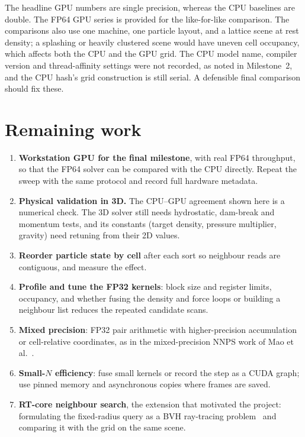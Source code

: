 \documentclass[11pt]{article}
\begin{document}
The headline GPU numbers are single precision, whereas the CPU baselines are double. The FP64 GPU series is provided for the like-for-like comparison. The comparisons also use one machine, one particle layout, and a lattice scene at rest density; a splashing or heavily clustered scene would have uneven cell occupancy, which affects both the CPU and the GPU grid. The CPU model name, compiler version and thread-affinity settings were not recorded, as noted in Milestone~2, and the CPU hash's grid construction is still serial. A defensible final comparison should fix these.

\section{Remaining work}\label{sec:future}

\begin{enumerate}
\item \textbf{Workstation GPU for the final milestone}, with real FP64 throughput, so that the FP64 solver can be compared with the CPU directly. Repeat the sweep with the same protocol and record full hardware metadata.
\item \textbf{Physical validation in 3D.} The CPU--GPU agreement shown here is a numerical check. The 3D solver still needs hydrostatic, dam-break and momentum tests, and its constants (target density, pressure multiplier, gravity) need retuning from their 2D values.
\item \textbf{Reorder particle state by cell} after each sort so neighbour reads are contiguous, and measure the effect.
\item \textbf{Profile and tune the FP32 kernels}: block size and register limits, occupancy, and whether fusing the density and force loops or building a neighbour list reduces the repeated candidate scans.
\item \textbf{Mixed precision}: FP32 pair arithmetic with higher-precision accumulation or cell-relative coordinates, as in the mixed-precision NNPS work of Mao et al.~\cite{mao2024}.
\item \textbf{Small-$N$ efficiency}: fuse small kernels or record the step as a CUDA graph; use pinned memory and asynchronous copies where frames are saved.
\item \textbf{RT-core neighbour search}, the extension that motivated the project: formulating the fixed-radius query as a BVH ray-tracing problem~\cite{zhu2022,meneses2026} and comparing it with the grid on the same scene.
\end{enumerate}
\end{document}
